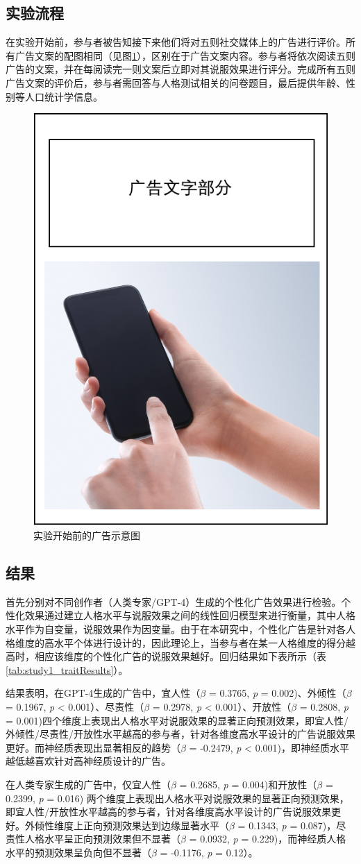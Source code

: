 \subsection{实验流程} 
在实验开始前，参与者被告知接下来他们将对五则社交媒体上的广告进行评价。所有广告文案的配图相同（见图\ref{fig:Study2-exp1-ad-example}），区别在于广告文案内容。参与者将依次阅读五则广告的文案，并在每阅读完一则文案后立即对其说服效果进行评分。完成所有五则广告文案的评价后，参与者需回答与人格测试相关的问卷题目，最后提供年龄、性别等人口统计学信息。

\begin{figure}[htbp]
    \centering
    \includegraphics[width=.3\linewidth]{Image/Study2-exp1.png}
    \caption{\label{fig:Study2-exp1-ad-example}实验开始前的广告示意图}
\end{figure}

\subsection{结果}
首先分别对不同创作者（人类专家/GPT-4）生成的个性化广告效果进行检验。个性化效果通过建立人格水平与说服效果之间的线性回归模型来进行衡量，其中人格水平作为自变量，说服效果作为因变量。由于在本研究中，个性化广告是针对各人格维度的高水平个体进行设计的，因此理论上，当参与者在某一人格维度的得分越高时，相应该维度的个性化广告的说服效果越好。回归结果如下表所示（表 \ref{tab:study1_traitResults}）。

结果表明，在GPT-4生成的广告中，宜人性（\textit{$\beta$} = 0.3765, \textit{p} = 0.002)、外倾性（\textit{$\beta$} = 0.1967, \textit{p} < 0.001）、尽责性（\textit{$\beta$} = 0.2978, \textit{p} < 0.001）、开放性（\textit{$\beta$} = 0.2808, \textit{p} = 0.001)四个维度上表现出人格水平对说服效果的显著正向预测效果，即宜人性/外倾性/尽责性/开放性水平越高的参与者，针对各维度高水平设计的广告说服效果更好。而神经质表现出显著相反的趋势（\textit{$\beta$} = -0.2479, \textit{p} < 0.001)，即神经质水平越低越喜欢针对高神经质设计的广告。

在人类专家生成的广告中，仅宜人性（\textit{$\beta$} = 0.2685, \textit{p} = 0.004)和开放性（\textit{$\beta$} = 0.2399, \textit{p} = 0.016) 两个维度上表现出人格水平对说服效果的显著正向预测效果，即宜人性/开放性水平越高的参与者，针对各维度高水平设计的广告说服效果更好。外倾性维度上正向预测效果达到边缘显著水平（\textit{$\beta$} = 0.1343, \textit{p} = 0.087)，尽责性人格水平呈正向预测效果但不显著（\textit{$\beta$} = 0.0932, \textit{p} = 0.229)，而神经质人格水平的预测效果呈负向但不显著（\textit{$\beta$} = -0.1176, \textit{p} = 0.12）。

